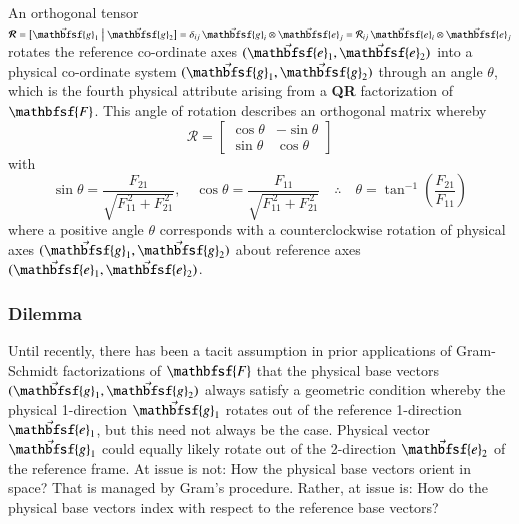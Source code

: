 An orthogonal tensor $\boldsymbol{\mathcal{R}} = \bigl[ \vec{\mathbfsf{g}}_1 \bigm| \vec{\mathbfsf{g}}_2 \bigr] = \delta_{ij} \, \vec{\mathbfsf{g}}_i \otimes \vec{\mathbfsf{e}}_j = \mathcal{R}_{ij} \, \vec{\mathbfsf{e}}_i \otimes \vec{\mathbfsf{e}}_j$ rotates the reference co-ordinate axes $( \vec{\mathbfsf{e}}_1 , \vec{\mathbfsf{e}}_2 )$ into a physical co-ordinate system $( \vec{\mathbfsf{g}}_1 , \vec{\mathbfsf{g}}_2 )$ through an angle $\theta$, which is the fourth physical attribute arising from a \textbf{QR} factorization of $\mathbfsf{F}$.  This angle of rotation describes an orthogonal matrix whereby
\begin{equation}
\boldsymbol{\mathcal{R}} = \begin{bmatrix}
\cos \theta & -\sin \theta \\
\sin \theta & \cos \theta
\end{bmatrix} 
\label{rotation}
\end{equation}  
with
\begin{equation}
\sin \theta = \frac{F_{21}}
{\sqrt{F_{11}^{\,2} + F_{21}^{\,2}}} , \quad
\cos \theta = \frac{F_{11}}
{\sqrt{F_{11}^{\,2} + F_{21}^{\,2}}} 
\quad \therefore \quad
\theta = \tan^{-1} \left( \frac{F_{21}}{F_{11}} \right)
\label{trigFns}
\end{equation}  
where a positive angle $\theta$ corresponds with a counter\-clockwise rotation of physical axes $( \vec{\mathbfsf{g}}_1 , \vec{\mathbfsf{g}}_2 )$ about reference axes $( \vec{\mathbfsf{e}}_1 , \vec{\mathbfsf{e}}_2 )$.


\subsubsection{Dilemma}
\label{secDilemma} 

Until recently, there has been a tacit assumption in prior applications of Gram-Schmidt factorizations of $\mathbfsf{F}$ that the physical base vectors $( \vec{\mathbfsf{g}}_1 , \vec{\mathbfsf{g}}_2 )$ always satisfy a geometric condition whereby the physical 1-direction $\vec{\mathbfsf{g}}_1$ rotates out of the reference 1-direction $\vec{\mathbfsf{e}}_1$, but this need not always be the case.  Physical vector $\vec{\mathbfsf{g}}_1$ could equally likely rotate out of the 2-direction $\vec{\mathbfsf{e}}_2$ of the reference frame.  At issue is not: How the physical base vectors orient in space?  That is managed by Gram's procedure.  Rather, at issue is: How do the physical base vectors index with respect to the reference base vectors?  

